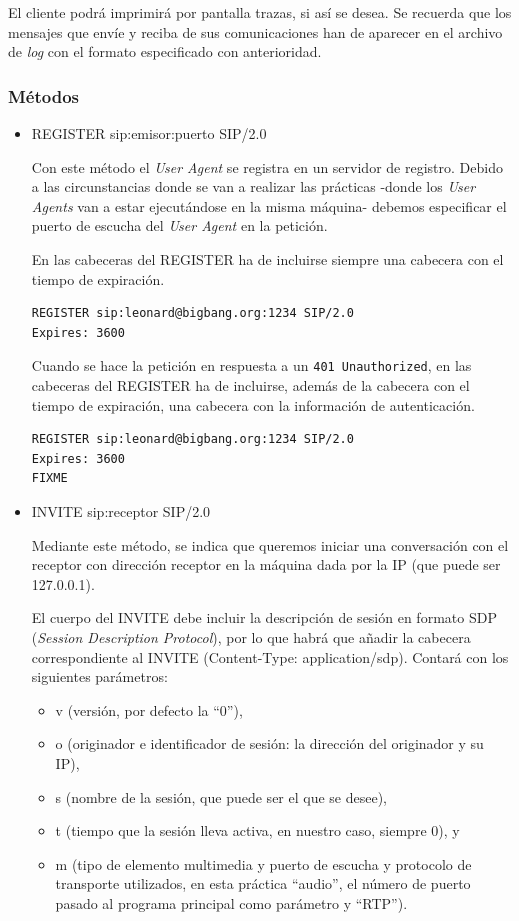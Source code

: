 \documentclass[a4paper,11pt]{article}
\begin{document}
El cliente podrá imprimirá por pantalla trazas, si así se desea. Se recuerda que 
los mensajes que envíe y reciba de sus comunicaciones han de aparecer
en el archivo de \emph{log} con el formato especificado con anterioridad.

\subsubsection{Métodos}

  \begin{itemize}
    \item REGISTER sip:emisor:puerto SIP/2.0

    Con este método el \emph{User Agent} se registra en un servidor de registro. Debido a las circunstancias donde se van a realizar las prácticas -donde los \emph{User Agents} van a estar ejecutándose en la misma máquina- debemos especificar el puerto de escucha del \emph{User Agent} en la petición.

    En las cabeceras del REGISTER ha de incluirse siempre una cabecera con el tiempo de expiración.

\begin{verbatim}
REGISTER sip:leonard@bigbang.org:1234 SIP/2.0
Expires: 3600
\end{verbatim}

    Cuando se hace la petición en respuesta a un \texttt{401 Unauthorized}, en las cabeceras del REGISTER ha de incluirse, además de la cabecera con el tiempo de expiración, una cabecera con la información de autenticación.

\begin{verbatim}
REGISTER sip:leonard@bigbang.org:1234 SIP/2.0
Expires: 3600
FIXME
\end{verbatim}


    \item INVITE sip:receptor SIP/2.0

    Mediante este método, se indica que queremos iniciar una conversación con el receptor con dirección receptor en la máquina dada por la IP (que puede ser 127.0.0.1).

    El cuerpo del INVITE debe incluir la descripción de sesión en formato
 SDP (\emph{Session Description Protocol}), por lo que habrá que añadir la cabecera correspondiente al INVITE (Content-Type: application/sdp). Contará con los siguientes parámetros:

\begin{itemize}
  \item v (versión, por defecto la ``0''),
  \item o (originador e identificador de sesión: la dirección del originador y su IP),
  \item s (nombre de la sesión, que puede ser el que se desee),
  \item t (tiempo que la sesión lleva activa, en nuestro caso, siempre 0), y
  \item m (tipo de elemento multimedia y puerto de escucha y protocolo de transporte utilizados, en esta práctica ``audio'', el número de puerto pasado al programa principal como parámetro y ``RTP'').
\end{itemize}


\end{itemize}
\end{document}
